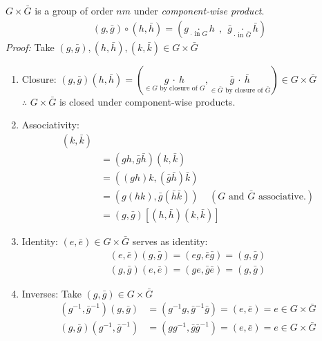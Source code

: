 \begin{proposition}
    $G\times \bar{G}$ is a group of order $nm$ under \textit{component-wise product}.\steezybreak\\
    \begin{align}
        (g,\bar{g})\circ (h,\bar{h}) = (g \underset{\cdot \text{ in } G}{\cdot} h \ \ , \ \  \bar{g}\underset{\cdot \text{ in }\bar{G}}{\cdot}\bar{h}) \nonumber
    \end{align}
    \textit{Proof:} Take $(g,\bar{g}), (h,\bar{h}), (k,\bar{k})\in G\times \bar{G}$
    \begin{enumerate}
        \item Closure: $(g,\bar{g})(h,\bar{h})= (\underset{\in G \text{ by closure of } G}{g \ \cdot \ h},\underset{\in \bar{G} \text{ by closure of } \bar{G}}{\bar{g}\ \cdot \ \bar{h}}) \in G\times \bar{G}$ \\ $\therefore$ $G\times \bar{G}$ is closed under component-wise products.
        \item Associativity: 
        \begin{align}
            [(g,\bar{g})(h,\bar{h})](k,\bar{k}) & \nonumber \\
            &= (gh,\bar{g}\bar{h})(k,\bar{k}) \nonumber \\
            &= ((gh)k,(\bar{g}\bar{h})\bar{k}) \nonumber \\
            &= (g(hk),\bar{g}(\bar{h}\bar{k})) \ \ \ \ \ (G \text{ and } \bar{G} \text{ associative.}) \nonumber \\
            &= (g,\bar{g})[(h,\bar{h})(k,\bar{k})]\nonumber
        \end{align}
        \item Identity: $(e,\bar{e}) \in G\times \bar{G}$ serves as identity:
        \begin{align}
            (e,\bar{e})(g,\bar{g})=(eg,\bar{e}\bar{g})= (g,\bar{g}) \nonumber \\
            (g,\bar{g})(e,\bar{e})=(ge,\bar{g}\bar{e})=(g,\bar{g}) \nonumber
        \end{align}
        \item Inverses: Take $(g,\bar{g})\in G\times \bar{G}$
        \begin{align}
            (g^{-1},\bar{g}^{-1})(g,\bar{g}) &= (g^{-1}g,\bar{g}^{-1}\bar{g})=(e,\bar{e})=e\in G\times \bar{G} \nonumber \\
            (g,\bar{g})(g^{-1},\bar{g}^{-1}) &= (gg^{-1},\bar{g}\bar{g}^{-1})=(e,\bar{e}) = e \in G\times \bar{G} \nonumber \\

\end{align}
\end{enumerate}
\end{proposition}
